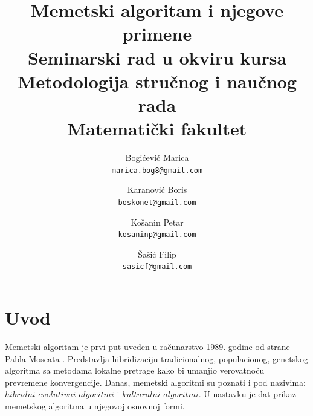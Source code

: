 \documentclass[a4paper]{article}
\begin{document}
\title{Memetski algoritam i njegove primene\\ \small{Seminarski rad u okviru kursa\\Metodologija stručnog i naučnog rada\\ Matematički fakultet}}


\author{
  Bogićević Marica\\
  \texttt{marica.bog8@gmail.com}
  \and
  Karanović Boris\\
  \texttt{boskonet@gmail.com}
    \and
  Košanin Petar\\
  \texttt{kosaninp@gmail.com}
    \and
  Šašić Filip\\
  \texttt{sasicf@gmail.com}
}


\maketitle


\tableofcontents

\newpage

\section{Uvod}
\label{sec:uvod}

Memetski algoritam je prvi put uveden u računarstvo 1989. godine od strane Pabla Moscata \cite{towardsmemetic}. Predstavlja hibridizaciju tradicionalnog, populacionog, genetskog algoritma sa metodama lokalne pretrage kako bi umanjio verovatnoću prevremene konvergencije. Danas, memetski algoritmi su poznati i pod nazivima: $hibridni$ $evolutivni$ $algoritmi$ i $kulturalni$ $algoritmi$. U nastavku je dat prikaz memetskog algoritma u njegovoj osnovnoj formi.
\end{document}
